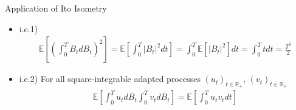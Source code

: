 \documentclass[12pt]{extarticle}
\newcommand{\<}{\langle}
\renewcommand{\>}{\rangle}
\theoremstyle{definition}
\begin{document}
Application of Ito Isometry \\
\begin{itemize}
    \item i.e.1)\\
    \begin{align*}
    \mathbb{E}\left[\left(\int^T_0 B_t dB_t \right)^2 \right] = \mathbb{E}\left[\int^T_0 \big|B_t\big|^2 dt \right] = \int^T_0 \mathbb{E}\left[ \big|B_t\big|^2 \right]dt = \int^T_0 tdt = \frac{T^2}{2}
    \end{align*}
    \item i.e.2) For all square-integrable adapted processes $(u_t)_{t \in \mathbb{R}_+}$, $(v_t)_{t \in \mathbb{R}_+}$\\
    \begin{align*}
    \mathbb{E}\left[\int^T_0 u_t dB_t \int^T_0 v_t dB_t \right] = \mathbb{E}\left[ \int^T_0 u_t v_t dt \right]
    \end{align*}
\end{itemize}
\end{document}
